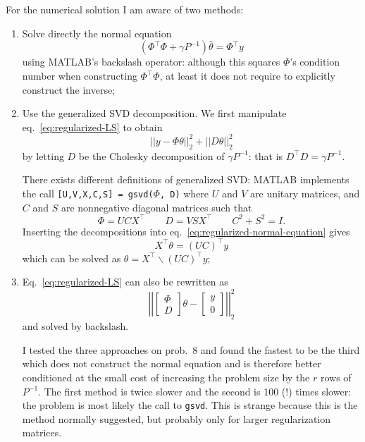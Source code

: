 For the numerical solution I am aware of two methods:
  \begin{enumerate}
  \item Solve directly the normal equation
    \begin{equation}
      \label{eq:regularized-normal-equation}
      \left(\Phi^\top\Phi + \gamma P^{-1}\right) \hat{\theta} = \Phi^\top y
    \end{equation} using MATLAB's backslash operator: although this squares $\Phi$'s condition number when constructing $\Phi^\top\Phi$, at least it does not require to explicitly construct the inverse;
  \item Use the generalized SVD decomposition.
    We first manipulate eq.~\eqref{eq:regularized-LS} to obtain
    \begin{equation*}
      ||y-\Phi \theta||_2^2 + ||D\theta||_2^2
    \end{equation*}
    by letting $D$ be the Cholesky decomposition of $\gamma P^{-1}$: that is $D^\top D = \gamma P^{-1}$.

    There exists different definitions of generalized SVD: MATLAB implements the call \texttt{[U,V,X,C,S] = gsvd($\Phi$, D)} where $U$ and $V$ are unitary matrices, and $C$ and $S$ are nonnegative diagonal matrices such that
    \begin{equation*}
      \Phi = UCX^\top\hspace{2em} D = VSX^\top\hspace{2em} C^2+S^2=I.
    \end{equation*}
    Inserting the decompositions into eq.~\eqref{eq:regularized-normal-equation} gives
    \begin{equation*}
      X^\top \theta = (UC)^\top y
    \end{equation*}
    which can be solved as $\theta = X^\top \backslash (UC)^\top y$;
  \item Eq.~\eqref{eq:regularized-LS} can also be rewritten as
    \begin{equation*}
      \left|\left|
          \begin{bmatrix}
            \Phi \\ D
          \end{bmatrix}\theta -
          \begin{bmatrix}
            y \\ 0
          \end{bmatrix}\right|\right|_2^2
    \end{equation*}
    and solved by backslash.

    I tested the three approaches on prob.~8 and found the fastest to be the third which does not construct the normal equation and is therefore better conditioned at the small cost of increasing the problem size by the $r$ rows of $P^{-1}$. The first method is twice slower and the second is 100 (!) times slower: the problem is most likely the call to \texttt{gsvd}. This is strange because this is the method normally suggested, but probably only for larger regularization matrices.
  \end{enumerate}

